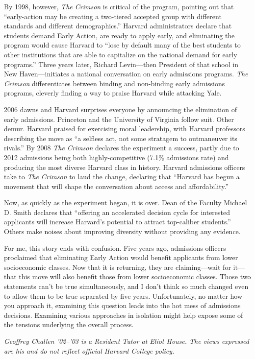 By 1998, however, \textit{The Crimson} is critical of the program, pointing
out that ``early-action may be creating a two-tiered accepted group with
different standards and different demographics.'' Harvard administrators
declare that students demand Early Action, are ready to apply early, and
eliminating the program would cause Harvard to ``lose by default many of the
best students to other institutions that are able to capitalize on the
national demand for early programs.'' Three years later, Richard Levin---then
President of that school in New Haven---initiates a national conversation on
early admissions programs. \textit{The Crimson} differentiates between
binding and non-binding early admissions programs, cleverly finding a way to
praise Harvard while attacking Yale.

2006 dawns and Harvard surprises everyone by announcing the elimination of
early admissions. Princeton and the University of Virginia follow suit. Other
demur. Harvard praised for exercising moral leadership, with Harvard
professors describing the move as ``a selfless act, not some stratagem to
outmaneuver its rivals.'' By 2008 \textit{The Crimson} declares the
experiment a success, partly due to 2012 admissions being both
highly-competitive (7.1\% admissions rate) and producing the most diverse
Harvard class in history. Harvard admissions officers take to \textit{The
Crimson} to laud the change, declaring that ``Harvard has begun a movement
that will shape the conversation about access and affordability.''

Now, as quickly as the experiment began, it is over. Dean of the Faculty
Michael D. Smith declares that ``offering an accelerated decision cycle for
interested applicants will increase Harvard’s potential to attract
top-caliber students.'' Others make noises about improving diversity without
providing any evidence.

For me, this story ends with confusion. Five years ago, admissions officers
proclaimed that eliminating Early Action would benefit applicants from lower
socioeconomic classes. Now that it is returning, they are claiming---wait for
it---that this move will also benefit those from lower socioeconomic classes.
Those two statements can't be true simultaneously, and I don't think so much
changed even to allow them to be true separated by five years. Unfortunately,
no matter how you approach it, examining this question leads into the hot
mess of admissions decisions. Examining various approaches in isolation might
help expose some of the tensions underlying the overall process.


\textit{Geoffrey Challen '02--'03 is a Resident Tutor at Eliot House. The
views expressed are his and do not reflect official Harvard College policy.}
